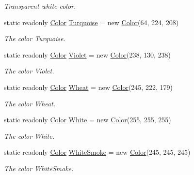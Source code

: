 \begin{DoxyCompactItemize}
\begin{DoxyCompactList}\small\item\em Transparent white color. \end{DoxyCompactList}\item 
static readonly \hyperlink{struct_tri_devs_1_1_tri_engine2_d_1_1_color}{Color} \hyperlink{struct_tri_devs_1_1_tri_engine2_d_1_1_color_af03f9d498682c9772382aab3be5c40e9}{Turquoise} = new \hyperlink{struct_tri_devs_1_1_tri_engine2_d_1_1_color}{Color}(64, 224, 208)
\begin{DoxyCompactList}\small\item\em The color Turquoise. \end{DoxyCompactList}\item 
static readonly \hyperlink{struct_tri_devs_1_1_tri_engine2_d_1_1_color}{Color} \hyperlink{struct_tri_devs_1_1_tri_engine2_d_1_1_color_a99717ebc17b83d156d0e43e07ca4845f}{Violet} = new \hyperlink{struct_tri_devs_1_1_tri_engine2_d_1_1_color}{Color}(238, 130, 238)
\begin{DoxyCompactList}\small\item\em The color Violet. \end{DoxyCompactList}\item 
static readonly \hyperlink{struct_tri_devs_1_1_tri_engine2_d_1_1_color}{Color} \hyperlink{struct_tri_devs_1_1_tri_engine2_d_1_1_color_a3e2cb6ef2db84bc381491daceb76e214}{Wheat} = new \hyperlink{struct_tri_devs_1_1_tri_engine2_d_1_1_color}{Color}(245, 222, 179)
\begin{DoxyCompactList}\small\item\em The color Wheat. \end{DoxyCompactList}\item 
static readonly \hyperlink{struct_tri_devs_1_1_tri_engine2_d_1_1_color}{Color} \hyperlink{struct_tri_devs_1_1_tri_engine2_d_1_1_color_a357b7882f6ad2927ccbbb770771ada26}{White} = new \hyperlink{struct_tri_devs_1_1_tri_engine2_d_1_1_color}{Color}(255, 255, 255)
\begin{DoxyCompactList}\small\item\em The color White. \end{DoxyCompactList}\item 
static readonly \hyperlink{struct_tri_devs_1_1_tri_engine2_d_1_1_color}{Color} \hyperlink{struct_tri_devs_1_1_tri_engine2_d_1_1_color_a13ce5fdf675d896e3d52195cc5dbe022}{White\-Smoke} = new \hyperlink{struct_tri_devs_1_1_tri_engine2_d_1_1_color}{Color}(245, 245, 245)
\begin{DoxyCompactList}\small\item\em The color White\-Smoke. \end{DoxyCompactList}\item 

\end{DoxyCompactItemize}

